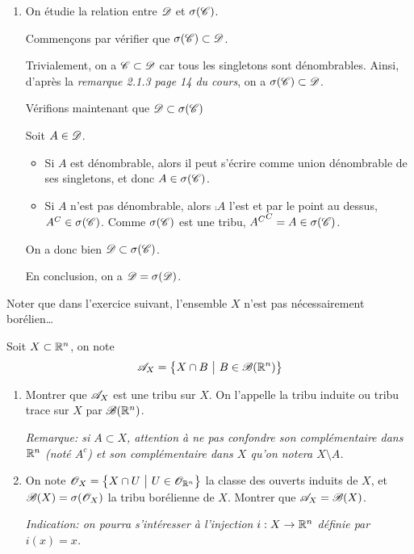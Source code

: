 {\begin{nntd-sol}[]
\begin{enumerate}
                \item On étudie la relation entre \(\mathscr{D}\) et \(\sigma(\mathscr{C})\).

                Commençons par vérifier que \(\sigma(\mathscr{C})\subset\mathscr{D}\).
                
                Trivialement, on a \(\mathscr{C}\subset\mathscr{D}\) car tous les singletons sont dénombrables. Ainsi, d'après 
                la \textit{remarque 2.1.3 page 14 du cours}, on a \(\sigma(\mathscr{C})\subset\mathscr{D}\).

                Vérifions maintenant que \(\mathscr{D} \subset\sigma(\mathscr{C})\)

                Soit \(A\in \mathscr{D}\).

                \begin{itemize}
                    \item Si \(A\) est dénombrable, alors il peut s'écrire comme union dénombrable de ses singletons, et donc \(A\in\sigma(\mathscr{C})\).

                    \item Si \(A\) n'est pas dénombrable, alors \(\comp A\) l'est et par le point au dessus, \({A}^C\in\sigma(\mathscr{C})\).
                    Comme \(\sigma(\mathscr{C})\) est une tribu, \({{A}^C}^C=A\in\sigma(\mathscr{C})\).
                \end{itemize}
                On a donc bien \(\mathscr{D}\subset\sigma(\mathscr{C})\).

                En conclusion, on a \(\mathscr{D}=\sigma(\mathscr{D})\).
            \end{enumerate}
    \end{nntd-sol}
}{}

%
\begin{nnremark}
    Noter que dans l'exercice suivant, l'ensemble \(X\) n'est pas nécessairement borélien\ldots
\end{nnremark}

\begin{td-exo}
    Soit \(X\subset \mathbb{R}^n\), on note
    \[
    \mathscr{A}_X=\big\{X\cap B\ \big|\ B\in\mathscr{B}(\mathbb{R}^n)\big\}
    \]
    \begin{enumerate}
        \item Montrer que \(\mathscr{A}_X\) est une tribu sur \(X\). On l'appelle la tribu induite ou tribu trace sur \(X\) par \(\mathscr{B}(\mathbb{R}^n)\).
        
        \textit{Remarque: si \(A\subset X\), attention à ne pas confondre son complémentaire dans \(\mathbb{R}^n\) (noté \(A^c\)) et son complémentaire dans \(X\) qu'on notera \(X\setminus A\).}
        
        \item On note \(\scr O_X=\big\{X\cap U\ \big|\ U\in\scr O_{\bb R^n}\big\}\) la classe des ouverts induits de \(X\), et \(\mathscr{B}(X)=\sigma(\mathscr{O}_X)\) la tribu borélienne de \(X\). Montrer que \(\mathscr{A}_X=\mathscr{B}(X)\).
        
        \textit{Indication: on pourra s'intéresser à l'injection \(i:X\to \mathbb{R}^n\) définie par \(i(x)=x\).}
    \end{enumerate}
\end{td-exo}


